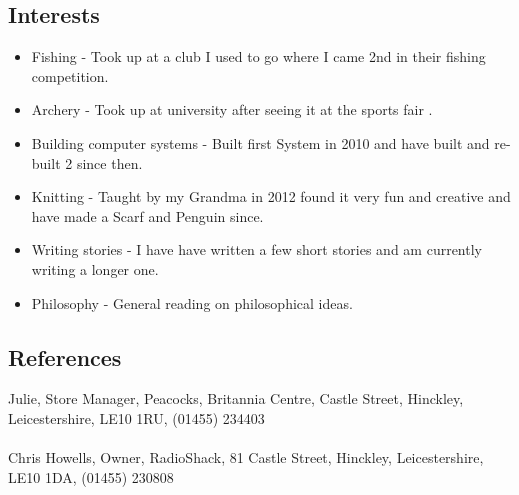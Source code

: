\documentclass[0pt]{article}
\begin{document}
\subsection*{Interests}
\begin{itemize}
	\item Fishing - Took up at a club I used to go where I came 2nd in their	 fishing competition.
	\item Archery - Took up at university after seeing it at the sports fair	.
	\item Building computer systems - Built first System in 2010 and have 		built and re-built 2 since then.
	\item Knitting - Taught by my Grandma in 2012 found it very fun and 		creative and have made a Scarf and Penguin since.
	\item Writing stories - I have have written a few short stories and am 		currently writing a longer one.
	\item Philosophy - General reading on philosophical ideas.
\end{itemize}

\subsection*{References}
Julie, Store Manager, Peacocks, Britannia Centre, Castle Street, Hinckley, Leicestershire, LE10 1RU, 
(01455) 234403
\\\\
Chris Howells, Owner, RadioShack, 81 Castle Street, Hinckley, Leicestershire, LE10 1DA,
(01455) 230808 
\end{document}
